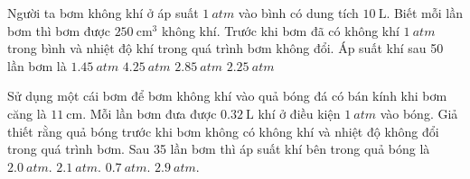 \begin{ex}
Người ta bơm không khí ở áp suất $\SI{1}{atm}$ vào bình có dung tích $\SI{10}{\liter}$. Biết mỗi lần bơm thì bơm được $\SI{250}{\centi\meter^3}$ không khí. Trước khi bơm đã có không khí $\SI{1}{atm}$ trong bình và nhiệt độ khí trong quá trình bơm không đổi. Áp suất khí sau 50 lần bơm là	
	\choice
	{$\SI{1.45}{atm}$}
	{$\SI{4.25}{atm}$}
	{$\SI{2.85}{atm}$}
	{\True $\SI{2.25}{atm}$}
\end{ex}
\begin{ex}
Sử dụng một cái bơm để bơm không khí vào quả bóng đá có bán kính khi bơm căng là $\SI{11}{\centi\meter}$. Mỗi lần bơm đưa được $\SI{0.32}{\liter}$ khí ở điều kiện $\SI{1}{atm}$ vào bóng. Giả thiết rằng quả bóng trước khi bơm không có không khí và nhiệt độ không đổi trong quá trình bơm. Sau 35 lần bơm thì áp suất khí bên trong quả bóng là	
	\choice
	{\True $\SI{2.0}{atm}.$}
	{$\SI{2.1}{atm}.$}
	{$\SI{0.7}{atm}.$}
	{$\SI{2.9}{atm}.$}
\end{ex}
